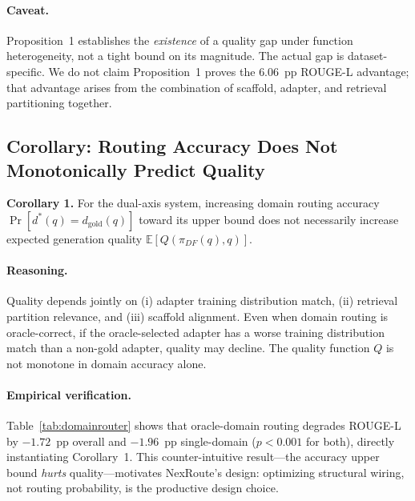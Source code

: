 \documentclass[a4paper,fleql,doubleblind]{cas-sc}
\begin{document}
\paragraph{Caveat.}
Proposition~1 establishes the \emph{existence} of a quality gap under function
heterogeneity, not a tight bound on its magnitude. The actual gap is dataset-specific.
We do not claim Proposition~1 proves the $6.06$~pp ROUGE-L advantage; that advantage
arises from the combination of scaffold, adapter, and retrieval partitioning together.

\subsection{Corollary: Routing Accuracy Does Not Monotonically Predict Quality}
\label{ssec:corollary}

\begin{tcolorbox}[colback=gray!5, colframe=gray!30, arc=2pt, boxrule=0.6pt,
  left=8pt, right=8pt, top=6pt, bottom=6pt]
\textbf{Corollary 1.}
For the dual-axis system, increasing domain routing accuracy
$\Pr[d^*(q) = d_{\text{gold}}(q)]$ toward its upper bound does not necessarily
increase expected generation quality $\mathbb{E}[Q(\pi_{DF}(q), q)]$.
\end{tcolorbox}

\paragraph{Reasoning.}
Quality depends jointly on (i) adapter training distribution match,
(ii) retrieval partition relevance, and (iii) scaffold alignment.
Even when domain routing is oracle-correct, if the oracle-selected adapter
has a worse training distribution match than a non-gold adapter, quality may decline.
The quality function $Q$ is not monotone in domain accuracy alone.

\paragraph{Empirical verification.}
Table~\ref{tab:domainrouter} shows that oracle-domain routing degrades ROUGE-L
by $-1.72$~pp overall and $-1.96$~pp single-domain ($p{<}0.001$ for both),
directly instantiating Corollary~1.
This counter-intuitive result---the accuracy upper bound \emph{hurts} quality---motivates
NexRoute's design: optimizing structural wiring, not routing probability, is
the productive design choice.
\end{document}
